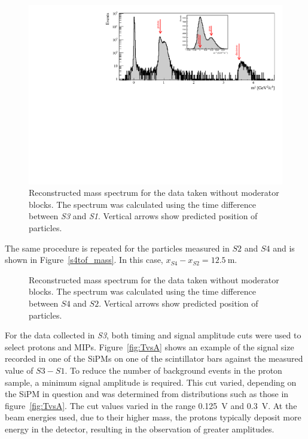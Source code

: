 \begin{figure}[h]
  \centering
  \includegraphics[width=0.9\linewidth]{files/Figures/Data_2018_8_31_b2_800MeV_0block_All.pdf}
  \caption{Reconstructed mass spectrum for the data taken without moderator blocks. The spectrum was calculated using the time difference between \textit{S3} and \textit{S1}. Vertical arrows show predicted position of particles.}
  \label{fig:s3tof_mass}
\end{figure}

The same procedure is repeated for the particles measured in $\mathit{S2}$ and $\mathit{S4}$ and is shown in Figure~\ref{s4tof_mass}.
In this case, $x_{\mathit{S4}}-x_{\mathit{S2}} = 12.5~\text{m}$.

\begin{figure}[h]
	\centering
	\begin{adjustbox}{max totalsize={.8\textwidth}{.5\textheight},center}
		
	\end{adjustbox}
	\caption{Reconstructed mass spectrum for the data taken without moderator blocks. The spectrum was calculated using the time difference between $\mathit{S4}$ and $\mathit{S2}$. Vertical arrows show predicted position of particles.}
	\label{fig:s4tof_mass}
\end{figure}

For the data collected in \textit{S3}, both timing and signal amplitude cuts were used to select protons and MIPs.
Figure~\ref{fig:TvsA} shows an example of the signal size recorded in one of the SiPMs on one of the scintillator bars against the measured value of $\mathit{S3} - \mathit{S1}$.
To reduce the number of background events in the proton sample, a minimum signal amplitude is required.
This cut varied, depending on the SiPM in question and was determined from distributions such as those in figure~\ref{fig:TvsA}. 
The cut values varied in the range 0.125~V and 0.3~V.
At the beam energies used, due to their higher mass, the protons typically deposit more energy in the detector, resulting in the observation of greater amplitudes.

